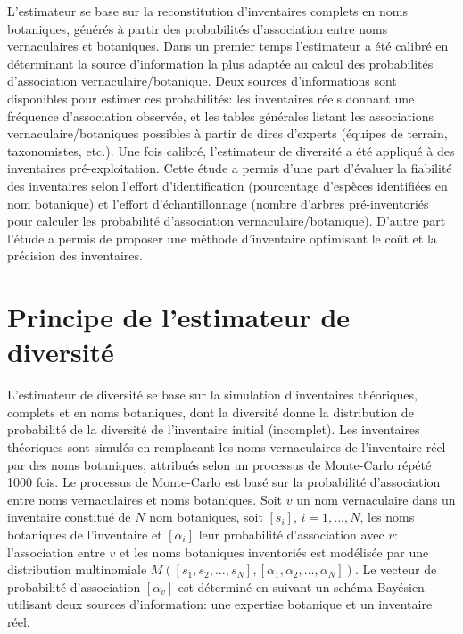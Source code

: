 \documentclass[
  11pt,
  french,
  A4paper,
  extrafontsizes,onecolumn,openright
  ]{memoir}
\begin{document}
L'estimateur se base sur la reconstitution d'inventaires complets en
noms botaniques, générés à partir des probabilités d'association entre
noms vernaculaires et botaniques. Dans un premier temps l'estimateur a
été calibré en déterminant la source d'information la plus adaptée au
calcul des probabilités d'association vernaculaire/botanique. Deux
sources d'informations sont disponibles pour estimer ces probabilités:
les inventaires réels donnant une fréquence d'association observée, et
les tables générales listant les associations vernaculaire/botaniques
possibles à partir de dires d'experts (équipes de terrain, taxonomistes,
etc.). Une fois calibré, l'estimateur de diversité a été appliqué à des
inventaires pré-exploitation. Cette étude a permis d'une part d'évaluer
la fiabilité des inventaires selon l'effort d'identification
(pourcentage d'espèces identifiées en nom botanique) et l'effort
d'échantillonnage (nombre d'arbres pré-inventoriés pour calculer les
probabilité d'association vernaculaire/botanique). D'autre part l'étude
a permis de proposer une méthode d'inventaire optimisant le coût et la
précision des inventaires.

\section{Principe de l'estimateur de
diversité}\label{principe-de-lestimateur-de-diversite}

L'estimateur de diversité se base sur la simulation d'inventaires
théoriques, complets et en noms botaniques, dont la diversité donne la
distribution de probabilité de la diversité de l'inventaire initial
(incomplet). Les inventaires théoriques sont simulés en remplacant les
noms vernaculaires de l'inventaire réel par des noms botaniques,
attribués selon un processus de Monte-Carlo répété 1000 fois. Le
processus de Monte-Carlo est basé sur la probabilité d'association entre
noms vernaculaires et noms botaniques. Soit \(v\) un nom vernaculaire
dans un inventaire constitué de \(N\) nom botaniques, soit \([s_i]\),
\(i={1,...,N}\), les noms botaniques de l'inventaire et \([\alpha_i]\)
leur probabilité d'association avec \(v\): l'association entre \(v\) et
les noms botaniques inventoriés est modélisée par une distribution
multinomiale
\(M([s_1, s_2, …, s_N] ,[\alpha_1, \alpha_2,…, \alpha_N])\). Le vecteur
de probabilité d'association \([\alpha_v]\) est déterminé en suivant un
schéma Bayésien utilisant deux sources d'information: une expertise
botanique et un inventaire réel.
\end{document}
